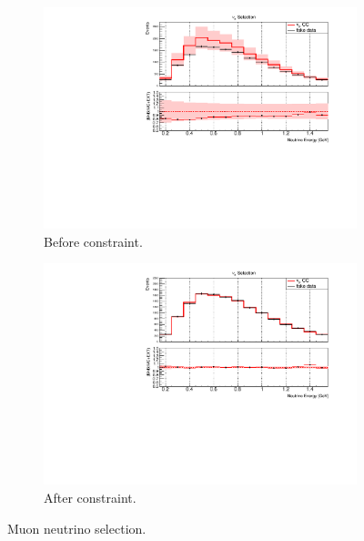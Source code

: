 \begin{figure}[H] 
\begin{center}
    \begin{subfigure}[b]{0.45\textwidth}
    \centering
    \includegraphics[width=1.00\textwidth]{Fakedata/set1/nue_numu_reco_e_H1_mc_fakedata_set1_numu_before_data_constraint.pdf}
    \caption{\label{fig:fakedata:set1:numu_before_constrain} Before constraint.}
    \end{subfigure}
    \begin{subfigure}[b]{0.45\textwidth}
    \centering
    \includegraphics[width=1.00\textwidth]{Fakedata/set1/nue_numu_reco_e_H1_mc_fakedata_set1_scaled_numu.pdf}
    \caption{\label{fig:fakedata:set1:numu_after_constrain} After constraint.}
    \end{subfigure}
\caption{\label{fig:fakedata:set1:numu_const} Muon neutrino selection.}
\end{center}
\end{figure}

